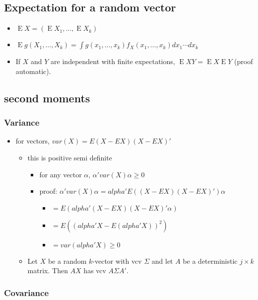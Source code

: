 \documentclass[11pt]{article}
\DeclareMathOperator{\E}{E}
\begin{document}
\subsection{Expectation for a random vector}
\label{sec-3-1}

\begin{itemize}
\item $\E X = (\E X_1,\dots,\E X_k)$
\item $\E g(X_1,\dots,X_k) = \int g(x_1,\dots,x_k) f_X(x_1,\dots,x_k)
       dx_1 \cdots dx_k$
\item If $X$ and $Y$ are independent with finite expectations, $\E XY
       = \E X \E Y$ (proof automatic).
\end{itemize}
\subsection{second moments}
\label{sec-3-2}
\subsubsection{Variance}
\label{sec-3-2-1}

\begin{itemize}
\item for vectors, $var(X) = E(X - EX) (X - EX)'$
\begin{itemize}
\item this is positive semi definite
\begin{itemize}
\item for any vector $\alpha$, $\alpha'var(X)\alpha \geq 0$
\item proof: $\alpha' var(X) \alpha = alpha' E((X - EX)(X - EX)') \alpha$
\begin{itemize}
\item $= E( alpha'(X - EX)(X - EX)' \alpha)$
\item $= E( (alpha'X - E(alpha'X))^2)$
\item $= var(alpha'X) \geq 0$
\end{itemize}
\end{itemize}
\item Let $X$ be a random $k$-vector with vcv $\Sigma$ and let
         $A$ be a deterministic $j \times k$ matrix.  Then $A X$
         has vcv $A \Sigma A'$.
\end{itemize}
\end{itemize}
\subsubsection{Covariance}
\label{sec-3-2-2}
\end{document}
